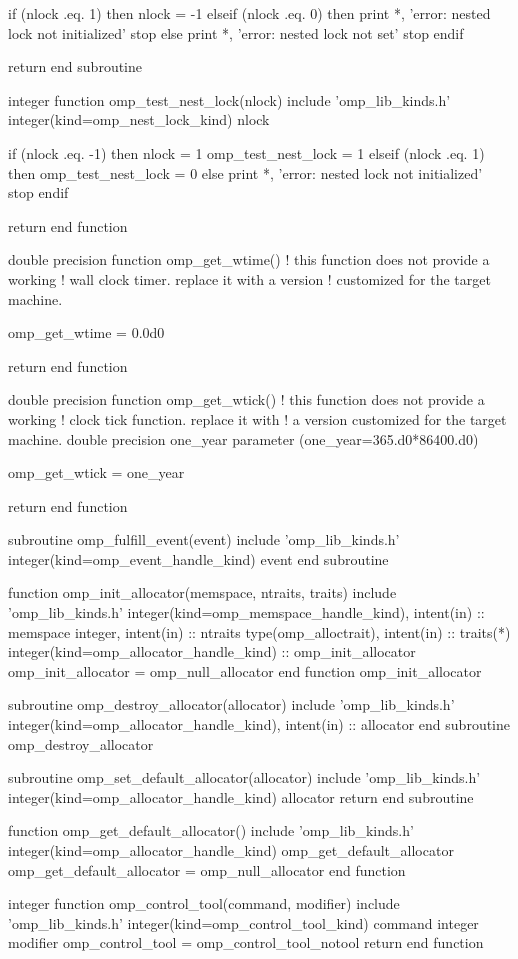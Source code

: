 {\begin{ompfFunction}
  if (nlock .eq. 1) then
    nlock = -1
  elseif (nlock .eq. 0) then
    print *, 'error: nested lock not initialized'
    stop
  else
    print *, 'error: nested lock not set'
    stop
  endif

  return
end subroutine

integer function omp_test_nest_lock(nlock)
  include 'omp_lib_kinds.h'
  integer(kind=omp_nest_lock_kind) nlock

  if (nlock .eq. -1) then
    nlock = 1
    omp_test_nest_lock = 1
  elseif (nlock .eq. 1) then
    omp_test_nest_lock = 0
  else
    print *, 'error: nested lock not initialized'
    stop
  endif

  return
end function

double precision function omp_get_wtime()
  ! this function does not provide a working
  ! wall clock timer. replace it with a version
  ! customized for the target machine.

  omp_get_wtime = 0.0d0

  return
end function

double precision function omp_get_wtick()
  ! this function does not provide a working
  ! clock tick function. replace it with
  ! a version customized for the target machine.
  double precision one_year
  parameter (one_year=365.d0*86400.d0)

  omp_get_wtick = one_year

  return
end function

subroutine omp_fulfill_event(event)
  include 'omp_lib_kinds.h'
  integer(kind=omp_event_handle_kind) event
end subroutine

function omp_init_allocator(memspace, ntraits, traits)
  include 'omp_lib_kinds.h'
  integer(kind=omp_memspace_handle_kind), intent(in) :: memspace
  integer, intent(in) :: ntraits
  type(omp_alloctrait), intent(in) :: traits(*)
  integer(kind=omp_allocator_handle_kind) :: omp_init_allocator
  omp_init_allocator = omp_null_allocator
end function omp_init_allocator

subroutine omp_destroy_allocator(allocator)
  include 'omp_lib_kinds.h'
  integer(kind=omp_allocator_handle_kind), intent(in) :: allocator
end subroutine omp_destroy_allocator

subroutine omp_set_default_allocator(allocator)
  include 'omp_lib_kinds.h'
  integer(kind=omp_allocator_handle_kind) allocator
  return
end subroutine

function omp_get_default_allocator()
  include 'omp_lib_kinds.h'
  integer(kind=omp_allocator_handle_kind) omp_get_default_allocator
  omp_get_default_allocator = omp_null_allocator
end function

integer function omp_control_tool(command, modifier)
  include 'omp_lib_kinds.h'
  integer(kind=omp_control_tool_kind) command
  integer modifier
  omp_control_tool = omp_control_tool_notool
  return
end function

\end{ompfFunction}} %

